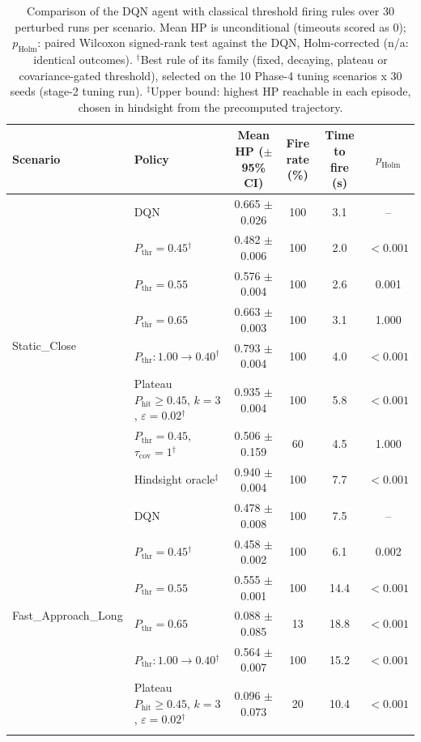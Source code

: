 \begin{table}[htbp]
\centering
\caption{Comparison of the DQN agent with classical threshold firing rules over 30 perturbed runs per scenario. Mean HP is unconditional (timeouts scored as 0); $p_{\mathrm{Holm}}$: paired Wilcoxon signed-rank test against the DQN, Holm-corrected (n/a: identical outcomes). $^{\dagger}$Best rule of its family (fixed, decaying, plateau or covariance-gated threshold), selected on the 10 Phase-4 tuning scenarios x 30 seeds (stage-2 tuning run). $^{\ddagger}$Upper bound: highest HP reachable in each episode, chosen in hindsight from the precomputed trajectory.}
\label{tab:comparison-traditional-rl}
\small
\begin{tabular}{llcccc}
\toprule
\textbf{Scenario} & \textbf{Policy} & \textbf{Mean HP ($\pm$95\% CI)} & \textbf{Fire rate (\%)} & \textbf{Time to fire (s)} & $p_{\mathrm{Holm}}$ \\
\midrule
\multirow{8}{*}{Static\_Close} & DQN & 0.665 $\pm$ 0.026 & 100 & 3.1 & -- \\
 & $P_{\mathrm{thr}}=0.45$$^{\dagger}$ & 0.482 $\pm$ 0.006 & 100 & 2.0 & $<0.001$ \\
 & $P_{\mathrm{thr}}=0.55$ & 0.576 $\pm$ 0.004 & 100 & 2.6 & 0.001 \\
 & $P_{\mathrm{thr}}=0.65$ & 0.663 $\pm$ 0.003 & 100 & 3.1 & 1.000 \\
 & $P_{\mathrm{thr}}: 1.00 \to 0.40$$^{\dagger}$ & 0.793 $\pm$ 0.004 & 100 & 4.0 & $<0.001$ \\
 & Plateau $P_{\mathrm{hit}}\geq0.45$, $k=3$, $\varepsilon=0.02$$^{\dagger}$ & 0.935 $\pm$ 0.004 & 100 & 5.8 & $<0.001$ \\
 & $P_{\mathrm{thr}}=0.45$, $\tau_{\mathrm{cov}}=1$$^{\dagger}$ & 0.506 $\pm$ 0.159 & 60 & 4.5 & 1.000 \\
 & Hindsight oracle$^{\ddagger}$ & 0.940 $\pm$ 0.004 & 100 & 7.7 & $<0.001$ \\
\midrule
\multirow{8}{*}{Fast\_Approach\_Long} & DQN & 0.478 $\pm$ 0.008 & 100 & 7.5 & -- \\
 & $P_{\mathrm{thr}}=0.45$$^{\dagger}$ & 0.458 $\pm$ 0.002 & 100 & 6.1 & 0.002 \\
 & $P_{\mathrm{thr}}=0.55$ & 0.555 $\pm$ 0.001 & 100 & 14.4 & $<0.001$ \\
 & $P_{\mathrm{thr}}=0.65$ & 0.088 $\pm$ 0.085 & 13 & 18.8 & $<0.001$ \\
 & $P_{\mathrm{thr}}: 1.00 \to 0.40$$^{\dagger}$ & 0.564 $\pm$ 0.007 & 100 & 15.2 & $<0.001$ \\
 & Plateau $P_{\mathrm{hit}}\geq0.45$, $k=3$, $\varepsilon=0.02$$^{\dagger}$ & 0.096 $\pm$ 0.073 & 20 & 10.4 & $<0.001$ \\
$$
\end{tabular}
\end{table}
